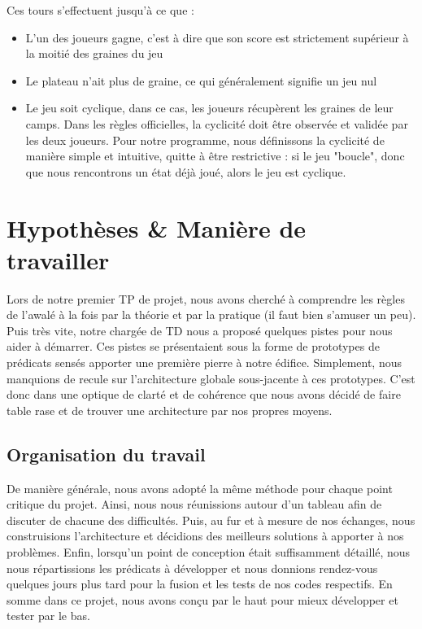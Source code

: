 \documentclass[]{article}
\begin{document}
Ces tours s'effectuent jusqu'à ce que :
\begin{itemize}
\item L'un des joueurs gagne, c'est à dire que son score est strictement supérieur à la moitié des graines du jeu
\item Le plateau n'ait plus de graine, ce qui généralement signifie un jeu nul
\item Le jeu soit cyclique, dans ce cas, les joueurs récupèrent les graines de leur camps. Dans les règles officielles, la cyclicité doit être observée et validée par les deux joueurs. Pour notre programme, nous définissons la cyclicité de manière simple et intuitive, quitte à être restrictive : si le jeu "boucle", donc que nous rencontrons un état déjà joué, alors le jeu est cyclique.
\end{itemize}



\section{Hypothèses \& Manière de travailler}

	Lors de notre premier TP de projet, nous avons cherché à comprendre les règles de l'awalé à la fois par la théorie et par la pratique (il faut bien s'amuser un peu).
Puis très vite, notre chargée de TD nous a proposé quelques pistes pour nous aider à démarrer. Ces pistes se présentaient sous la forme de prototypes de prédicats sensés apporter une première pierre à notre édifice.
Simplement, nous manquions de recule sur l'architecture globale sous-jacente à ces prototypes. C'est donc dans une optique de clarté et de cohérence que nous avons décidé de faire table rase et de trouver une architecture par nos propres moyens.

\subsection{Organisation du travail}

	De manière générale, nous avons adopté la même méthode pour chaque point critique du projet.
Ainsi, nous nous réunissions autour d'un tableau afin de discuter de chacune des difficultés. Puis, au fur et à mesure de nos échanges, nous construisions l'architecture et décidions des meilleurs solutions à apporter à nos problèmes.
Enfin, lorsqu'un point de conception était suffisamment détaillé, nous nous répartissions les prédicats à développer et nous donnions rendez-vous quelques jours plus tard pour la fusion et les tests de nos codes respectifs.
En somme dans ce projet, nous avons conçu par le haut pour mieux développer et tester par le bas.
\end{document}
